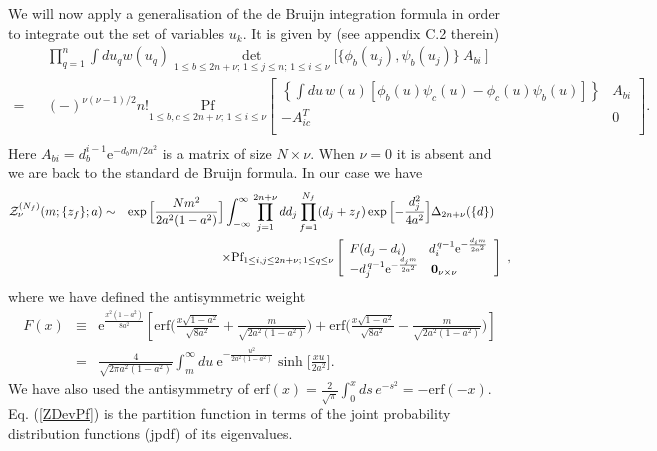 \documentclass[11pt]{article}
\newcommand{\bea}{\begin{eqnarray}}
\newcommand{\eea}{\end{eqnarray}}
\newcommand{\nn}{\nonumber}
\newcommand{\e}{\mbox{e}}
\newcommand{\erf}{\mbox{erf}}
\def\Pf{\mbox{Pf}}
\begin{document}
We will now apply a generalisation of the de Bruijn integration formula
in order to integrate out the set of variables $u_k$.
It is given by \cite{KG} (see appendix C.2 therein)
\bea
&&\prod_{q=1}^{n} \int du_q w(u_q)
\det_{1\leq b\leq 2n+\nu;\,1\leq j\leq n;\,1\leq i\leq \nu}
\Big[\{\phi_b(u_{j}),\psi_b(u_{j})\}\ A_{bi}\ \Big]\nn\\
=&&
(-)^{\nu(\nu-1)/2}n!\underset{1\leq b,c\leq
  2n+\nu;\,1\leq i\leq \nu}{\Pf}\left[\!\!
\begin{array}{ll}
\left\{\int du \,
w(u)[\phi_b(u)\psi_c(u)-\phi_c(u)\psi_b(u)]
\right\}\!&\!A_{bi}\\
-A^T_{ic}&\!0\\
\end{array}\!
\right].
\nn\\
&&
\label{gendeB}
\eea
Here $A_{bi}=d_b^{i-1}\e^{-d_bm/2a^2}$ is a matrix of size
$N\times\nu$. When $\nu=0$ it is 
absent and we are back to the standard de Bruijn formula.
In our case we have
\bea
{\cal Z}_{\nu}^{(N_f)}(m;\{z_f\};a) &\sim&
\exp\Big[\frac{Nm^{2}}{2a^2(1-a^2)}\Big]
\int_{-\infty}^\infty\prod_{j=1}^{2n+\nu}
dd_j\prod_{f=1}^{N_f}(d_j+z_f)
\exp\Big[{-\frac{d_j^2}{4a^2}}\Big]
\Delta_{2n+\nu}(\{d\})\ \ \ \ 
\label{ZDevPf}
\\
&&\times\Pf_{1\leq i,j\leq 2n+\nu;\,1\leq q\leq \nu}
\left[
\begin{array}{ll}
F(d_j-d_i)& \!d_i^{\, q-1}\e^{-\frac{d_im}{2a^2}}\\
 -d_j^{\, q-1}\e^{-\frac{d_jm}{2a^2}} & {\mathbf 0}_{\nu\times\nu}\\
\end{array}
\right]\ ,
\nn
\eea
where we have defined the antisymmetric weight
\bea
F(x)
&\equiv& \e^{\frac{x^2(1-a^2)}{8a^2}}
\left[\erf\Big(\frac{x\sqrt{1-a^2}}{\sqrt{8a^2}}
+\frac{m}{\sqrt{2a^2(1-a^2)}}\Big)  
+
\erf\Big(\frac{x\sqrt{1-a^2}}{\sqrt{8a^2}}-\frac{m}{\sqrt{2a^2(1-a^2)}}\Big)
\right]
\label{Fdef}\\
&=& \frac{4}{\sqrt{2\pi a^2(1-a^2)}}\int_m^\infty du\
\e^{-\frac{u^2}{2a^2(1-a^2)}} 
\sinh\Big[\frac{xu}{2a^2}\Big].\nn
\eea
We have also used the antisymmetry of 
$\erf(x)=\frac{2}{\sqrt{\pi}}\int_0^xds\,e^{-s^2}=-\erf(-x)$.
Eq. (\ref{ZDevPf}) is the partition function in terms of the joint
probability distribution functions (jpdf) of its eigenvalues.
\end{document}
